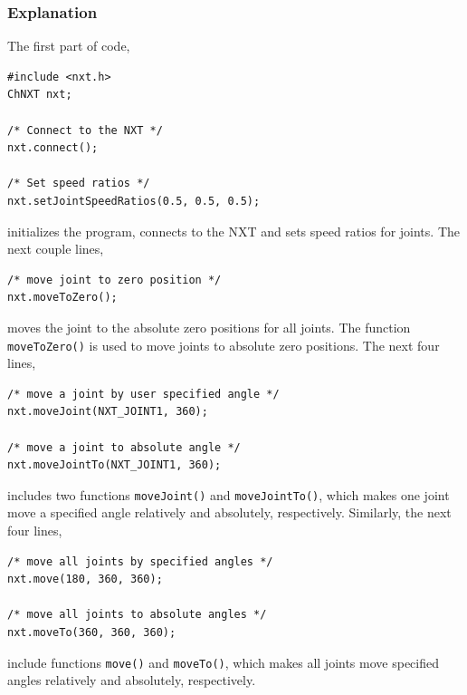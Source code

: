 \documentclass[11pt]{article}
\begin{document}
\subsubsection*{Explanation}
The first part of code,
\begin{lstlisting}
#include <nxt.h>
ChNXT nxt;

/* Connect to the NXT */
nxt.connect();

/* Set speed ratios */
nxt.setJointSpeedRatios(0.5, 0.5, 0.5);
\end{lstlisting}
initializes the program, connects to the NXT and sets speed ratios for joints. 
The next couple lines,
\begin{lstlisting}
/* move joint to zero position */
nxt.moveToZero();
\end{lstlisting}
moves the joint to the absolute zero positions for all joints. The function 
{\tt moveToZero()} is used to move joints to absolute zero positions. The next 
four lines,

\begin{lstlisting}
/* move a joint by user specified angle */
nxt.moveJoint(NXT_JOINT1, 360);

/* move a joint to absolute angle */
nxt.moveJointTo(NXT_JOINT1, 360);
\end{lstlisting}
includes two functions {\tt moveJoint()} and {\tt moveJointTo()}, which makes one joint move a specified angle
relatively and absolutely, respectively. Similarly, the next four lines,
\begin{lstlisting}
/* move all joints by specified angles */
nxt.move(180, 360, 360);

/* move all joints to absolute angles */
nxt.moveTo(360, 360, 360);
\end{lstlisting}
include functions {\tt move()} and {\tt moveTo()}, which makes all joints 
move specified angles relatively and absolutely, respectively.

\end{document}
